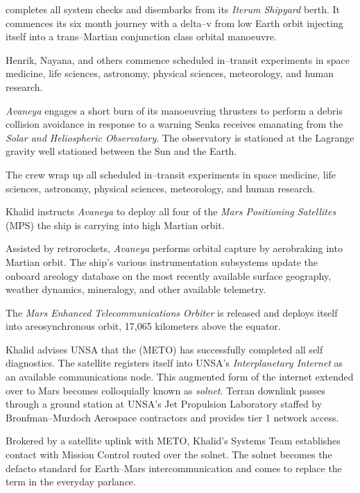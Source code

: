  completes all system checks and disembarks from its {\it Iterum Shipyard} berth. It commences its six month journey with a delta--v from low Earth orbit injecting itself into a trans--Martian conjunction class orbital manoeuvre.
\StopTimelineDate

Henrik, Nayana, and others commence scheduled in--transit experiments in space medicine, life sciences, astronomy, physical sciences, meteorology, and human research.
\StopTimelineDate

{\it Avaneya} engages a short burn of its manoeuvring thrusters to perform a debris collision avoidance in response to a warning Senka receives emanating from the {\it Solar and Heliospheric Observatory}. The observatory is stationed at the Lagrange  gravity well stationed between the Sun and the Earth.
\StopTimelineDate

The crew wrap up all scheduled in--transit experiments in space medicine, life sciences, astronomy, physical sciences, meteorology, and human research.
\StopTimelineDate

Khalid instructs {\it Avaneya} to deploy all four of the {\it Mars Positioning Satellites} (MPS) the ship is carrying into high Martian orbit.
\StopTimelineDate

Assisted by retrorockets, {\it Avaneya} performs orbital capture by aerobraking into Martian orbit. The ship's various instrumentation subsystems update the onboard areology database on the most recently available surface geography, weather dynamics, mineralogy, and other available telemetry.

The {\it Mars Enhanced Telecommunications Orbiter} is released and deploys itself into areosynchronous orbit, 17,065 kilometers above the equator.
\StopTimelineDate

Khalid advises UNSA that the  (METO) has successfully completed all self diagnostics. The satellite registers itself into UNSA's {\it Interplanetary Internet} as an available communications node. This augmented form of the internet extended over to Mars becomes colloquially known as {\it solnet}. Terran downlink passes through a ground station at UNSA's Jet Propulsion Laboratory staffed by Bronfman--Murdoch Aerospace contractors and provides tier 1 network access.

Brokered by a satellite uplink with METO, Khalid's Systems Team establishes contact with Mission Control routed over the solnet. The solnet becomes the defacto standard for Earth--Mars intercommunication and comes to replace the term  in the everyday parlance.
\StopTimelineDate

